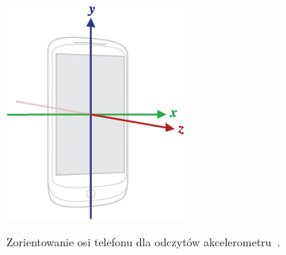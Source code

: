 \begin{figure}[!ht]
 \begin{center}
  \scalebox{0.6}
  {
   \includegraphics{figures/accelerometer_axes.png}
  }
 \end{center}
 \caption{Zorientowanie osi telefonu dla odczytów akcelerometru~\cite{and:doc:phone:axes}.}
 \label{fig:accelerometer_axes}
\end{figure}
